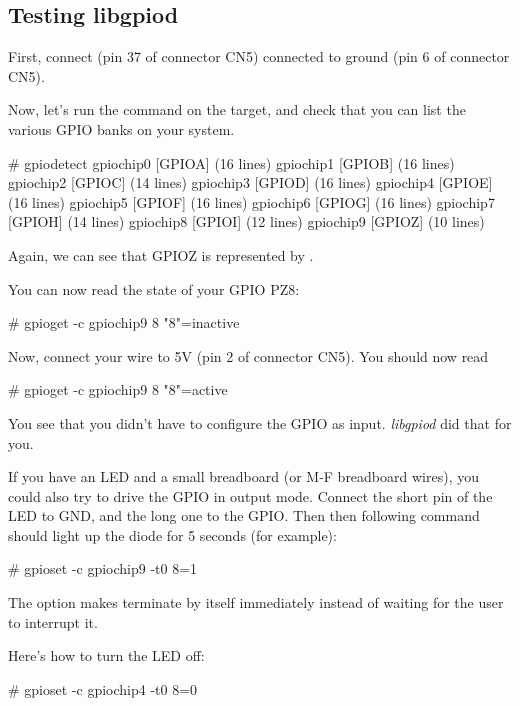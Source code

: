 \subsection{Testing libgpiod}

First, connect  (pin 37 of connector CN5) connected
to ground (pin 6 of connector CN5).

Now, let's run the  command on the target, and check that
you can list the various GPIO banks on your system.

\begin{bashinput}
# gpiodetect
gpiochip0 [GPIOA] (16 lines)
gpiochip1 [GPIOB] (16 lines)
gpiochip2 [GPIOC] (14 lines)
gpiochip3 [GPIOD] (16 lines)
gpiochip4 [GPIOE] (16 lines)
gpiochip5 [GPIOF] (16 lines)
gpiochip6 [GPIOG] (16 lines)
gpiochip7 [GPIOH] (14 lines)
gpiochip8 [GPIOI] (12 lines)
gpiochip9 [GPIOZ] (10 lines)
\end{bashinput}

Again, we can see that GPIOZ is represented by .

You can now read the state of  your GPIO PZ8:

\begin{bashinput}
# gpioget -c gpiochip9 8
"8"=inactive
\end{bashinput}

Now, connect your wire to 5V (pin 2 of connector CN5). You should now
read

\begin{bashinput}
# gpioget -c gpiochip9 8
"8"=active
\end{bashinput}

You see that you didn't have to configure the GPIO as input. {\em
libgpiod} did that for you.

If you have an LED and a small breadboard (or M-F breadboard wires),
you could also try to drive the GPIO in output mode. Connect the short
pin of the LED to GND, and the long one to the GPIO. Then then following
command should light up the diode for 5 seconds (for example):

\begin{bashinput}
# gpioset -c gpiochip9 -t0 8=1
\end{bashinput}

The  option makes  terminate by itself
immediately instead of waiting for the user to interrupt it.

Here's how to turn the LED off:

\begin{bashinput}
# gpioset -c gpiochip4 -t0 8=0
\end{bashinput}


